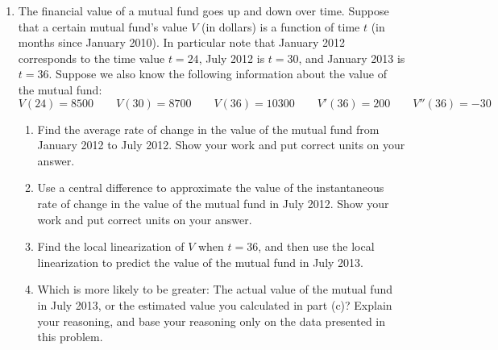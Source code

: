 \documentclass[11pt]{article}
\begin{document}
\begin{enumerate}
	\item The financial value of a mutual fund goes up and down over time. Suppose that a certain mutual fund's value $V$ (in dollars) is a function of time $t$ (in months since January 2010). In particular note that January 2012 corresponds to the time value $t = 24$, July 2012 is $t=30$, and January 2013 is $t = 36$. Suppose we also know the following information about the value of the mutual fund: 
	\[ V(24) = 8500 \qquad V(30) = 8700 \qquad V(36) = 10300 \qquad V'(36) = 200 \qquad V''(36) = -30 \]
	
	\begin{enumerate}
		\item Find the average rate of change in the value of the mutual fund from January 2012 to July 2012. Show your work and put correct units on your answer. 
		\item Use a central difference to approximate the value of the instantaneous rate of change in the value of the mutual fund in July 2012. Show your work and put correct units on your answer.
		\item Find the local linearization of $V$ when $t=36$, and then use the local linearization to predict the value of the mutual fund in July 2013.
		\item Which is more likely to be greater: The actual value of the mutual fund in July 2013, or the estimated value you calculated in part (c)? Explain your reasoning, and base your reasoning only on the data presented in this problem. 
	\end{enumerate}


\end{enumerate}
	
\end{document}
